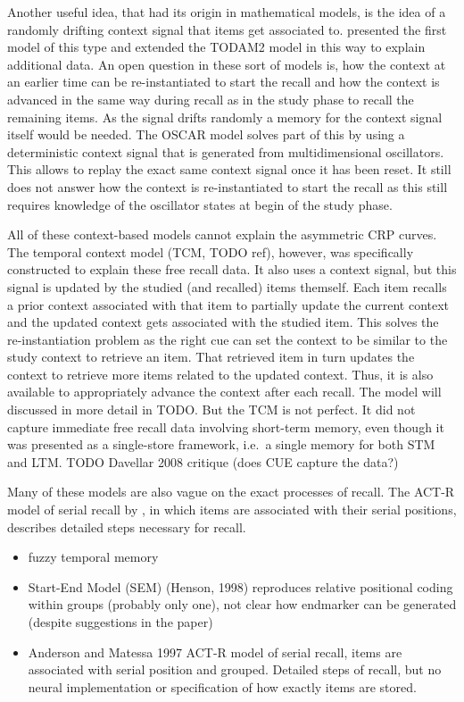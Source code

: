 Another useful idea, that had its origin in mathematical models, is the idea of a randomly drifting context signal that items get associated to.
\Textcite{Estes1955} presented the first model of this type and \textcite{Murdock1997} extended the TODAM2 model in this way to explain additional data.
An open question in these sort of models is, how the context at an earlier time can be re-instantiated to start the recall and how the context is advanced in the same way during recall as in the study phase to recall the remaining items.
As the signal drifts randomly a memory for the context signal itself would be needed.
The OSCAR model \parencite{Brown2000} solves part of this by using a deterministic context signal that is generated from multidimensional oscillators.
This allows to replay the exact same context signal once it has been reset.
It still does not answer how the context is re-instantiated to start the recall as this still requires knowledge of the oscillator states at begin of the study phase.

All of these context-based models cannot explain the asymmetric CRP curves.
The temporal context model (TCM, TODO ref), however, was specifically constructed to explain these free recall data.
It also uses a context signal, but this signal is updated by the studied (and recalled) items themself.
Each item recalls a prior context associated with that item to partially update the current context and the updated context gets associated with the studied item.
This solves the re-instantiation problem as the right cue can set the context to be similar to the study context to retrieve an item.
That retrieved item in turn updates the context to retrieve more items related to the updated context.
Thus, it is also available to appropriately advance the context after each recall.
The model will discussed in more detail in TODO\@.
But the TCM is not perfect.
It did not capture immediate free recall data involving short-term memory, even though it was presented as a single-store framework, i.e.\ a single memory for both STM and LTM\@.
TODO Davellar 2008 critique (does CUE capture the data?)

Many of these models are also vague on the exact processes of recall.
The ACT-R model of serial recall by \textcite{Anderson1997}, in which items are associated with their serial positions, describes detailed steps necessary for recall.




\begin{itemize}
    \item fuzzy temporal memory
    \item Start-End Model (SEM) (Henson, 1998) reproduces relative positional coding within groups (probably only one), not clear how endmarker can be generated (despite suggestions in the paper)
    \item Anderson and Matessa 1997 ACT-R model of serial recall, items are associated with serial position and grouped. Detailed steps of recall, but no neural implementation or specification of how exactly items are stored.
\end{itemize}


